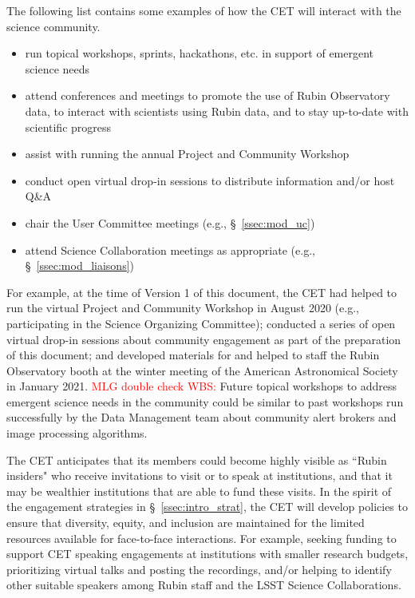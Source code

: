 \documentclass[DM,lsstdraft,toc]{lsstdoc}
\begin{document}
The following list contains some examples of how the CET will interact with the science community.
\begin{itemize}
\item run topical workshops, sprints, hackathons, etc. in support of emergent science needs
\item attend conferences and meetings to promote the use of Rubin Observatory data, to interact with scientists using Rubin data, and to stay up-to-date with scientific progress
\item assist with running the annual Project and Community Workshop
\item conduct open virtual drop-in sessions to distribute information and/or host Q\&A 
\item chair the User Committee meetings (e.g., \S~\ref{ssec:mod_uc})
\item attend Science Collaboration meetings as appropriate (e.g., \S~\ref{ssec:mod_liaisons})
\end{itemize}

For example, at the time of Version 1 of this document, the CET had helped to run the virtual Project and Community Workshop in August 2020 (e.g., participating in the Science Organizing Committee); conducted a series of open virtual drop-in sessions about community engagement as part of the preparation of this document; and developed materials for and helped to staff the Rubin Observatory booth at the winter meeting of the American Astronomical Society in January 2021. 
\textcolor{red}{MLG double check WBS:} Future topical workshops to address emergent science needs in the community could be similar to past workshops run successfully by the Data Management team about community alert brokers and image processing algorithms. 

The CET anticipates that its members could become highly visible as ``Rubin insiders" who receive invitations to visit or to speak at institutions, and that it may be wealthier institutions that are able to fund these visits.
In the spirit of the engagement strategies in \S~\ref{ssec:intro_strat}, the CET will develop policies to ensure that diversity, equity, and inclusion are maintained for the limited resources available for face-to-face interactions. 
For example, seeking funding to support CET speaking engagements at institutions with smaller research budgets, prioritizing virtual talks and posting the recordings, and/or helping to identify other suitable speakers among Rubin staff and the LSST Science Collaborations.
\end{document}
